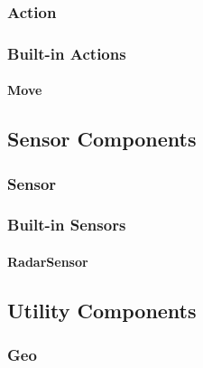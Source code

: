 \documentclass[titlepage]{article}
\begin{document}
\subsubsection{Action}
\subsubsection{Built-in Actions}
\paragraph{Move}

\subsection{Sensor Components}
\subsubsection{Sensor}

\subsubsection{Built-in Sensors}
\paragraph{RadarSensor}

\subsection{Utility Components}
\subsubsection{Geo}
\end{document}
